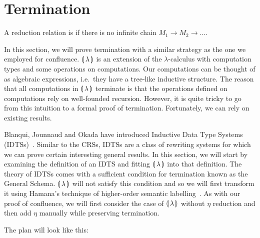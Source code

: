 \section{Termination}
\label{sec:termination}

\begin{definition}
  A reduction relation is  if there is no infinite chain
  $M_1 \to M_2 \to \ldots$.
\end{definition}

In this section, we will prove termination with a similar strategy as the
one we employed for confluence. $\llparenthesis \, \lambda \, \rrparenthesis$ is an extension of the
$\lambda$-calculus with computation types and some operations on
computations. Our computations can be thought of as algebraic expressions,
i.e.\ they have a tree-like inductive structure. The reason that all
computations in $\llparenthesis \, \lambda \, \rrparenthesis$ terminate is that the operations defined on
computations rely on well-founded recursion. However, it is quite tricky to
go from this intuition to a formal proof of termination. Fortunately, we
can rely on existing results.

Blanqui, Jounnaud and Okada have introduced Inductive Data Type Systems
(IDTSs)~\cite{blanqui2002inductive,blanqui2000termination}. Similar to the
CRSs, IDTSs are a class of rewriting systems for which we can prove certain
interesting general results. In this section, we will start by examining
the definition of an IDTS and fitting $\llparenthesis \, \lambda \, \rrparenthesis$ into that
definition. The theory of IDTSs comes with a sufficient condition for
termination known as the General Schema. $\llparenthesis \, \lambda \, \rrparenthesis$ will not
satisfy this condition and so we will first transform it using Hamana's
technique of higher-order semantic labelling~\cite{hamana2007higher}. As
with our proof of confluence, we will first consider the case of
$\llparenthesis \, \lambda \, \rrparenthesis$ without $\eta$ reduction and then add $\eta$ manually
while preserving termination.

The plan will look like this:

